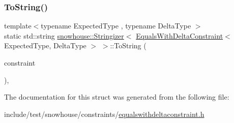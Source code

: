 \subsubsection{\texorpdfstring{ToString()}{ToString()}}
{\footnotesize\ttfamily template$<$typename Expected\+Type , typename Delta\+Type $>$ \\
static std\+::string \mbox{\hyperlink{structsnowhouse_1_1Stringizer}{snowhouse\+::\+Stringizer}}$<$ \mbox{\hyperlink{structsnowhouse_1_1EqualsWithDeltaConstraint}{Equals\+With\+Delta\+Constraint}}$<$ Expected\+Type, Delta\+Type $>$ $>$\+::To\+String (\begin{DoxyParamCaption}\item[{const \mbox{\hyperlink{structsnowhouse_1_1EqualsWithDeltaConstraint}{Equals\+With\+Delta\+Constraint}}$<$ Expected\+Type, Delta\+Type $>$ \&}]{constraint }\end{DoxyParamCaption})\hspace{0.3cm}{\ttfamily [inline]}, {\ttfamily [static]}}



The documentation for this struct was generated from the following file\+:\begin{DoxyCompactItemize}
\item 
include/test/snowhouse/constraints/\mbox{\hyperlink{equalswithdeltaconstraint_8h}{equalswithdeltaconstraint.\+h}}\end{DoxyCompactItemize}
